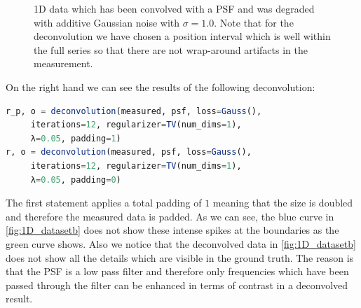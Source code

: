 \documentclass{juliacon}
\begin{document}
\begin{figure}[H]
\begin{subfigure}[b]{.25\textwidth}
                \caption{}
                \label{fig:1D_datasetb}
            \end{subfigure}
            \caption{1D data which has been convolved with a PSF and was degraded with additive Gaussian noise with $\sigma=1.0$. Note that for the deconvolution we have chosen a position interval which is well within the full series so that there are not wrap-around artifacts in the measurement.}
            \label{fig:1D_dataset}
        \end{figure}
        On the right hand we can see the results of the following deconvolution:
        \begin{lstlisting}[language=Julia]
r_p, o = deconvolution(measured, psf, loss=Gauss(),
     iterations=12, regularizer=TV(num_dims=1),
     λ=0.05, padding=1)
r, o = deconvolution(measured, psf, loss=Gauss(), 
     iterations=12, regularizer=TV(num_dims=1),
     λ=0.05, padding=0)
        \end{lstlisting}
    The first statement applies a total padding of $1$ meaning that the size is doubled and therefore the measured data is padded.
    As we can see, the blue curve in \autoref{fig:1D_datasetb} does not show these intense spikes at the boundaries as the green curve shows.
    Also we notice that the deconvolved data in \autoref{fig:1D_datasetb} does not show all the details which are visible in the ground truth.
    The reason is that the PSF is a low pass filter and therefore only frequencies which have been passed through the filter 
    can be enhanced in terms of contrast in a deconvolved result.
\end{document}

